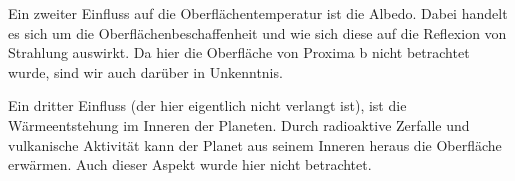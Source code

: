\begin{enumerate}
	Ein zweiter Einfluss auf die Oberflächentemperatur ist die Albedo. Dabei handelt es sich um die Oberflächenbeschaffenheit und wie sich diese auf die Reflexion von Strahlung auswirkt. Da hier die Oberfläche von Proxima b nicht betrachtet wurde, sind wir auch darüber in Unkenntnis.

	Ein dritter Einfluss (der hier eigentlich nicht verlangt ist), ist die Wärmeentstehung im Inneren der Planeten. Durch radioaktive Zerfalle und vulkanische Aktivität kann der Planet aus seinem Inneren heraus die Oberfläche erwärmen. Auch dieser Aspekt wurde hier nicht betrachtet.
	
\end{enumerate}